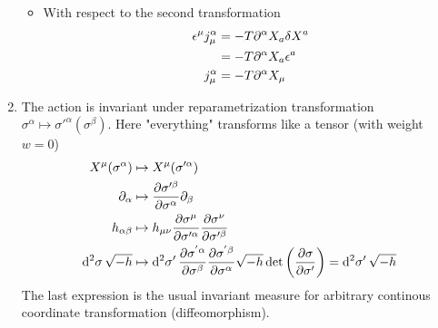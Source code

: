\begin{enumerate}[label=(\alph*)]
\begin{itemize}
			\item With respect to the second transformation
				\begin{align}
					\epsilon^\mu j^\alpha_\mu &= -T \partial^\alpha X_a \delta X^a \notag \\
													  &= -T \partial^\alpha X_a \epsilon^a  \notag \\
													 j^\alpha_\mu &= -T \partial^\alpha X_\mu
				\end{align}
		\end{itemize}
	\item The action is invariant under reparametrization transformation $\sigma^\alpha \mapsto \sigma'^\alpha (\sigma^\beta)$. Here "everything" transforms like a tensor (with weight $w=0$)
		\begin{align*}
			X^\mu (\sigma^\alpha) &\mapsto X^\mu (\sigma'^\alpha) \\
			\partial_\alpha &\mapsto \pdv{\sigma'^\beta}{\sigma^\alpha} \partial_\beta \\
			h_{\alpha \beta} &\mapsto h_{\mu\nu} \pdv{\sigma^\mu}{\sigma'^\alpha} \pdv{\sigma^\nu}{\sigma'^\beta} \\
			\dd[2]{\sigma}\sqrt{-h} &\mapsto \dd[2]{\sigma'} \pdv{\sigma^{'\alpha}}{\sigma^\beta} \pdv{\sigma^{' \beta}}{\sigma^\alpha}  \sqrt{- h}  \det \left(\pdv{\sigma}{\sigma'} \right) = \dd[2]{\sigma'} \sqrt{-h}
		\end{align*}
		The last expression is the usual invariant measure for arbitrary continous coordinate transformation (diffeomorphism).


\end{enumerate}
